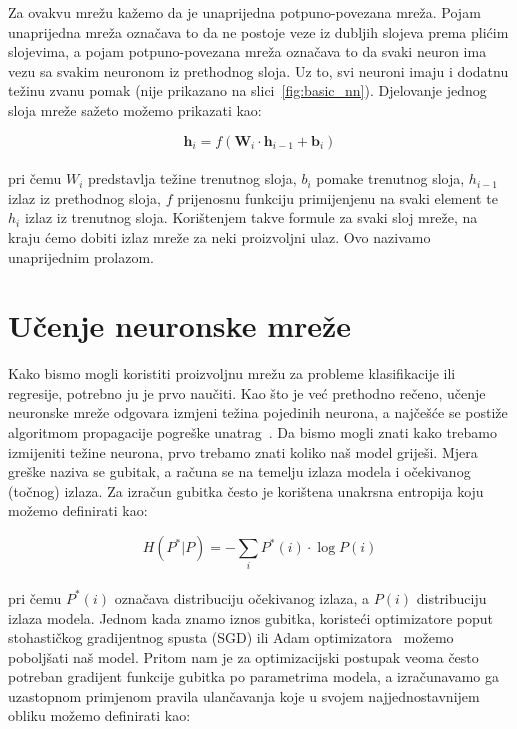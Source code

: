\documentclass[times, utf8, zavrsni, numeric]{fer}
\begin{document}
Za ovakvu mrežu kažemo da je unaprijedna potpuno-povezana mreža. 
Pojam unaprijedna mreža označava to da ne postoje veze iz dubljih slojeva prema plićim slojevima, a pojam potpuno-povezana mreža označava to da svaki neuron ima vezu sa svakim neuronom iz prethodnog sloja.
Uz to, svi neuroni imaju i dodatnu težinu zvanu pomak (nije prikazano na slici~\ref{fig:basic_nn}). Djelovanje jednog sloja mreže sažeto možemo prikazati kao:

\begin{equation}
    \pmb{h}_{i} = f(\pmb{W}_{i} \cdot \pmb{h}_{i-1} + \pmb{b}_{i})
    \label{eq:nn_layer}
\end{equation}
\\
pri čemu $W_{i}$ predstavlja težine trenutnog sloja, $b_{i}$ pomake trenutnog sloja, $h_{i-1}$ izlaz iz prethodnog sloja, $f$ prijenosnu funkciju primijenjenu na svaki element te $h_{i}$ izlaz iz trenutnog sloja.
Korištenjem takve formule za svaki sloj mreže, na kraju ćemo dobiti izlaz mreže za neki proizvoljni ulaz. Ovo nazivamo unaprijednim prolazom.

\section{Učenje neuronske mreže}
Kako bismo mogli koristiti proizvoljnu mrežu za probleme klasifikacije ili regresije, potrebno ju je prvo naučiti. 
Kao što je već prethodno rečeno, učenje neuronske mreže odgovara izmjeni težina pojedinih neurona, a najčešće se postiže algoritmom propagacije pogreške unatrag~\cite{Goodfellow-et-al-2016}.
Da bismo mogli znati kako trebamo izmijeniti težine neurona, prvo trebamo znati koliko naš model griješi. Mjera greške naziva se gubitak, a računa se na temelju izlaza modela i očekivanog (točnog) izlaza.
Za izračun gubitka često je korištena unakrsna entropija koju možemo definirati kao:

\begin{equation}
    H(P^{*}|P) = -\sum_{i}P^{*}(i) \cdot \log{P(i)}
    \label{eq:cross_entropy}
\end{equation}
\\
pri čemu $P^{*}(i)$ označava distribuciju očekivanog izlaza, a $P(i)$ distribuciju izlaza modela.
Jednom kada znamo iznos gubitka, koristeći optimizatore poput stohastičkog gradijentnog spusta (SGD) ili Adam optimizatora~\cite{kingma2014adam} možemo poboljšati naš model. 
Pritom nam je za optimizacijski postupak veoma često potreban gradijent funkcije gubitka po parametrima modela, a izračunavamo ga uzastopnom primjenom pravila ulančavanja koje u svojem najjednostavnijem obliku možemo definirati kao:
\end{document}
